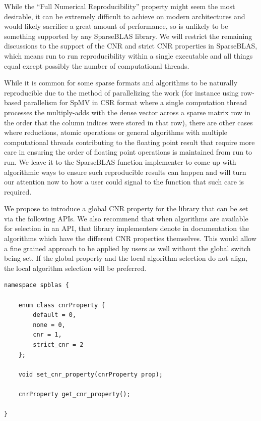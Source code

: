 \documentclass[manuscript,review]{acmart}
\begin{document}
While the ``Full Numerical Reproducibility'' property might seem the most desirable, it can be extremely difficult to achieve on modern architectures and would likely sacrifice a great amount of performance, so is unlikely to be something supported by any SparseBLAS library.  We will restrict the remaining discussions to the support of the CNR and strict CNR properties in SparseBLAS, which means run to run reproducibility within a single executable and all things equal except possibly the number of computational threads.

While it is common for some sparse formats and algorithms to be naturally reproducible due to the method of parallelizing the work (for instance using row-based parallelism for SpMV in CSR format where a single computation thread processes the multiply-adds with the dense vector across a sparse matrix row in the order that the column indices were stored in that row), there are other cases where reductions, atomic operations or general algorithms with multiple computational threads contributing to the floating point result that require more care in ensuring the order of floating point operations is maintained from run to run.  We leave it to the SparseBLAS function implementer to come up with algorithmic ways to ensure such reproducible results can happen and will turn our attention now to how a user could signal to the function that such care is required.

We propose to introduce a global CNR property for the library that can be set via the following APIs. We also recommend that when algorithms are available for selection in an API, that library implementers denote in documentation the  algorithms which have the different CNR properties themselves.  This would allow a fine grained approach to be applied by users as well without the global switch being set. If the global property and the local algorithm selection do not align, the local algorithm selection will be preferred.

\begin{listing}[h]
\caption{Conditional Numerical Reproducibility properties in SparseBLAS}
\label{listing:cnr}
\begin{verbatim}
namespace spblas {

    enum class cnrProperty {
        default = 0,
        none = 0,
        cnr = 1,
        strict_cnr = 2
    };

    void set_cnr_property(cnrProperty prop); 

    cnrProperty get_cnr_property();

}
\end{verbatim}
\end{listing}
\end{document}
